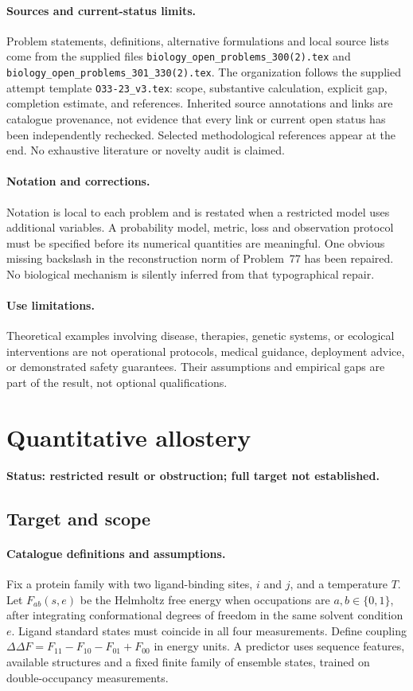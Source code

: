 \documentclass[11pt]{article}
\begin{document}
\paragraph{Sources and current-status limits.}
Problem statements, definitions, alternative formulations and local source lists
come from the supplied files
\texttt{biology\_open\_problems\_300(2).tex} and
\texttt{biology\_open\_problems\_301\_330(2).tex}.
The organization follows the supplied attempt template
\texttt{O33-23\_v3.tex}: scope, substantive calculation, explicit gap,
completion estimate, and references. Inherited source annotations and links are
catalogue provenance, not evidence that every link or current open status has
been independently rechecked. Selected methodological references appear at the
end. No exhaustive literature or novelty audit is claimed.

\paragraph{Notation and corrections.}
Notation is local to each problem and is restated when a restricted model uses
additional variables. A probability model, metric, loss and observation protocol
must be specified before its numerical quantities are meaningful. One obvious
missing backslash in the reconstruction norm of Problem~77 has been repaired.
No biological mechanism is silently inferred from that typographical repair.

\paragraph{Use limitations.}
Theoretical examples involving disease, therapies, genetic systems, or ecological
interventions are not operational protocols, medical guidance, deployment advice,
or demonstrated safety guarantees. Their assumptions and empirical gaps are part
of the result, not optional qualifications.


\section*{Quantitative allostery}
\label{prob:004}
\noindent\textbf{Status: restricted result or obstruction; full target not established.}
\subsection{Target and scope}
\paragraph{Catalogue definitions and assumptions.}
Fix a protein family with two ligand-binding sites, $i$ and $j$, and a temperature $T$. Let $F_{ab}(s,e)$ be the Helmholtz free energy when occupations are $a,b\in\{0,1\}$, after integrating conformational degrees of freedom in the same solvent condition $e$. Ligand standard states must coincide in all four measurements. Define coupling $\Delta\Delta F=F_{11}-F_{10}-F_{01}+F_{00}$ in energy units. A predictor uses sequence features, available structures and a fixed finite family of ensemble states, trained on double-occupancy measurements.
\end{document}
